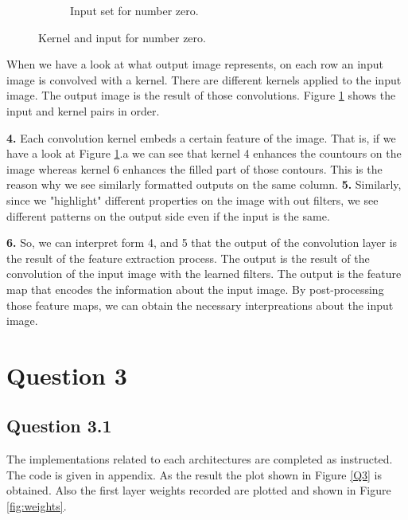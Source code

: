 \documentclass{assignment}
\begin{document}
\begin{figure}[htbp!]
\begin{subfigure}{0.5\textwidth}
        \caption{Input set for number zero.}
    \end{subfigure}
    \caption{Kernel and input for number zero.}
    \label{fig:kernel_input}
\end{figure}
When we have a look at what output image represents, on each row an input image is convolved with a kernel. There are different kernels applied to the input image. The output image is the result of those convolutions. Figure \ref{fig:kernel_input} shows the input and kernel pairs in order.

\textbf{4.}
Each convolution kernel embeds a certain feature of the image. That is, if we have a look at Figure \ref{fig:kernel_input}.a we can see that kernel 4 enhances the countours on the image whereas kernel 6 enhances the filled part of those contours. This is the reason why we see similarly formatted outputs on the same column.
\textbf{5.}
Similarly, since we "highlight" different properties on the image with out filters, we see different patterns on the output side even if the input is the same.

\textbf{6.}
So, we can interpret form 4, and 5 that the output of the convolution layer is the result of the feature extraction process. The output is the result of the convolution of the input image with the learned filters. The output is the feature map that encodes the information about the input image. By post-processing those feature maps, we can obtain the necessary interpreations about the input image.

\section{Question 3}
\subsection{Question 3.1}
The implementations related to each architectures are completed as instructed. The code is given in appendix. As the result the plot shown in Figure \ref{Q3} is obtained. Also the first layer weights recorded are plotted and shown in Figure \ref{fig:weights}.
\end{document}
